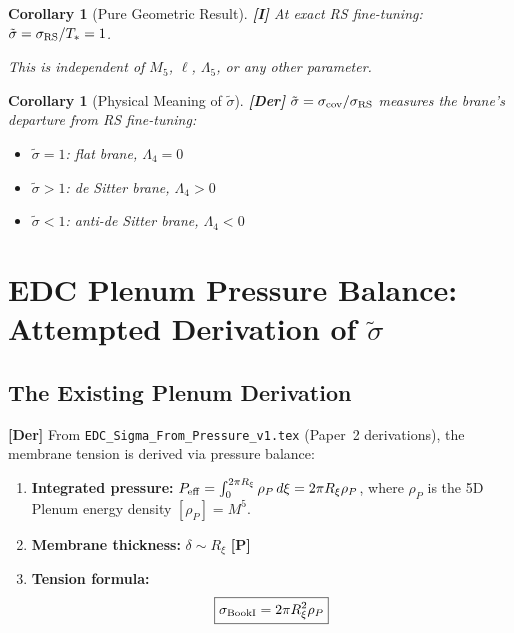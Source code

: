 \documentclass[11pt,a4paper]{article}
\newcommand{\tagDer}{\textcolor{derivedblue}{\textbf{[Der]}}}
\newcommand{\tagI}{\textcolor{mathpurple}{\textbf{[I]}}}
\newcommand{\tagP}{\textcolor{proposedred}{\textbf{[P]}}}
\newtheorem{corollary}[proposition]{Corollary}
\theoremstyle{definition}
\theoremstyle{remark}
\begin{document}
\begin{corollary}[Pure Geometric Result] \tagI
\label{cor:stilde1}
At exact RS fine-tuning: $\tilde\sigma = \sigma_{\rm RS}/T_* = 1$.

This is independent of $M_5$, $\ell$, $\Lambda_5$, or any other parameter.
\end{corollary}

\begin{corollary}[Physical Meaning of $\tilde\sigma$] \tagDer
$\tilde\sigma = \sigma_{\rm cov}/\sigma_{\rm RS}$ measures the brane's
departure from RS fine-tuning:
\begin{itemize}
\item $\tilde\sigma = 1$: flat brane, $\Lambda_4 = 0$
\item $\tilde\sigma > 1$: de Sitter brane, $\Lambda_4 > 0$
\item $\tilde\sigma < 1$: anti-de Sitter brane, $\Lambda_4 < 0$
\end{itemize}
\end{corollary}

\section{EDC Plenum Pressure Balance: Attempted Derivation of $\tilde\sigma$}
\label{sec:plenum}

\subsection{The Existing Plenum Derivation}

\tagDer{} From \texttt{EDC\_Sigma\_From\_Pressure\_v1.tex}
(Paper~2 derivations), the membrane tension is derived via pressure
balance:

\begin{enumerate}
\item \textbf{Integrated pressure:}
  $P_{\rm eff} = \int_0^{2\pi R_\xi} \rho_P\, d\xi
  = 2\pi R_\xi \rho_P$,
  where $\rho_P$ is the 5D Plenum energy density $[\rho_P] = M^5$.

\item \textbf{Membrane thickness:} $\delta \sim R_\xi$ \tagP

\item \textbf{Tension formula:}
\begin{equation}
\boxed{\sigma_{\rm BookI} = 2\pi R_\xi^2 \rho_P}
\label{eq:sigma_plenum}
\end{equation}
\end{enumerate}
\end{document}
